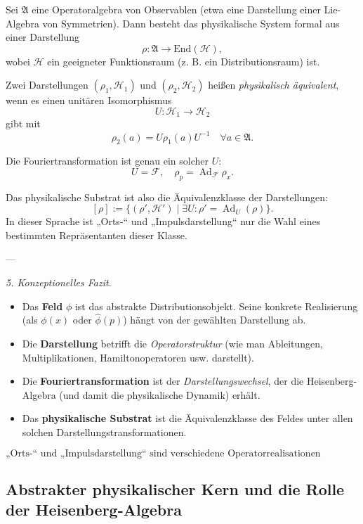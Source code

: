 \documentclass[10pt, letterpaper]{article}
\newcommand{\Ad}{\operatorname{Ad}}
\newcommand{\End}{\mathrm{End}}
\begin{document}
Sei \(\mathfrak{A}\) eine Operatoralgebra von Observablen (etwa eine Darstellung einer Lie-Algebra von Symmetrien).  
Dann besteht das physikalische System formal aus einer Darstellung
\[
\rho:\mathfrak{A}\to\End(\mathcal{H}),
\]
wobei \(\mathcal{H}\) ein geeigneter Funktionsraum (z. B. ein Distributionsraum) ist.

Zwei Darstellungen \((\rho_1,\mathcal{H}_1)\) und \((\rho_2,\mathcal{H}_2)\)
heißen \emph{physikalisch äquivalent}, wenn es einen unitären Isomorphismus
\[
U:\mathcal{H}_1\to\mathcal{H}_2
\]
gibt mit
\[
\rho_2(a)=U\rho_1(a)U^{-1}\quad\forall a\in\mathfrak{A}.
\]

Die Fouriertransformation ist genau ein solcher \(U\):
\[
U=\mathcal{F},\quad \rho_p=\Ad_{\mathcal{F}}\rho_x.
\]

Das physikalische Substrat ist also die Äquivalenzklasse der Darstellungen:
\[
[\rho]:=\{(\rho',\mathcal{H}')\mid \exists U:\rho'=\Ad_U(\rho)\}.
\]
In dieser Sprache ist „Orts-“ und „Impulsdarstellung“ nur die Wahl eines bestimmten Repräsentanten dieser Klasse.

---

\emph{5. Konzeptionelles Fazit.}

\begin{itemize}
\item Das \textbf{Feld} \(\phi\) ist das abstrakte Distributionsobjekt.  
      Seine konkrete Realisierung (als \(\phi(x)\) oder \(\widehat{\phi}(p)\))
      hängt von der gewählten Darstellung ab.
\item Die \textbf{Darstellung} betrifft die \emph{Operatorstruktur}
      (wie man Ableitungen, Multiplikationen, Hamiltonoperatoren usw. darstellt).
\item Die \textbf{Fouriertransformation} ist der \emph{Darstellungswechsel},
      der die Heisenberg-Algebra (und damit die physikalische Dynamik) erhält.
\item Das \textbf{physikalische Substrat} ist die Äquivalenzklasse des Feldes
      unter allen solchen Darstellungstransformationen.
\end{itemize}

\[
\boxed{
\text{„Orts-“ und „Impulsdarstellung“ sind verschiedene Operatorrealisationen desselben Distributionsobjekts.}
}
\]


\subsection{Abstrakter physikalischer Kern und die Rolle der Heisenberg-Algebra}
\end{document}
